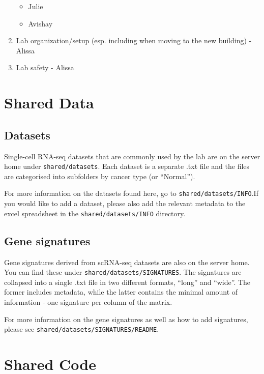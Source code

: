 \documentclass[]{book}
\providecommand{\tightlist}{%
  \setlength{\itemsep}{0pt}\setlength{\parskip}{0pt}}
\begin{document}
\begin{enumerate}
  \begin{itemize}
  \tightlist
  \item
    Julie
  \item
    Avishay
  \end{itemize}
\item
  Lab organization/setup (esp. including when moving to the new
  building) - Alissa
\item
  Lab safety - Alissa
\end{enumerate}

\chapter{Shared Data}\label{sharedData}

\section{Datasets}\label{datasets}

Single-cell RNA-seq datasets that are commonly used by the lab are on
the server home under \texttt{shared/datasets}. Each dataset is a
separate .txt file and the files are categorised into subfolders by
cancer type (or ``Normal'').

For more information on the datasets found here, go to
\texttt{shared/datasets/INFO}.If you would like to add a dataset, please
also add the relevant metadata to the excel spreadsheet in the
\texttt{shared/datasets/INFO} directory.

\section{Gene signatures}\label{gene-signatures}

Gene signatures derived from scRNA-seq datasets are also on the server
home. You can find these under \texttt{shared/datasets/SIGNATURES}. The
signatures are collapsed into a single .txt file in two different
formats, ``long'' and ``wide''. The former includes metadata, while the
latter contains the minimal amount of information - one signature per
column of the matrix.

For more information on the gene signatures as well as how to add
signatures, please see \texttt{shared/datasets/SIGNATURES/README}.

\chapter{Shared Code}\label{sharedCode}
\end{document}
